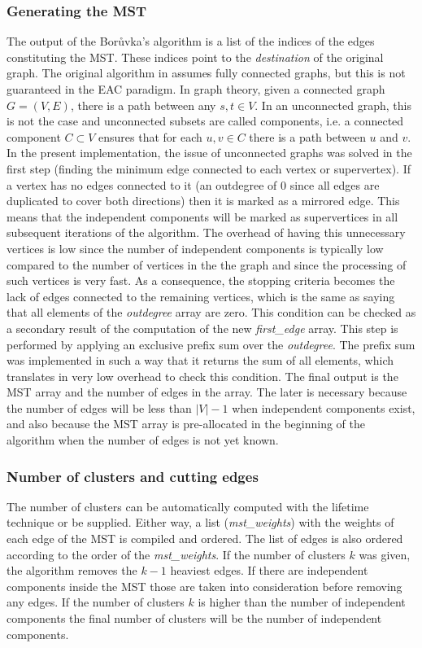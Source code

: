 \subsubsection{Generating the MST}
The output of the Borůvka's algorithm is a list of the indices of the edges constituting the MST. 
These indices point to the \emph{destination} of the original graph. 
The original algorithm in \cite{Sousa2015} assumes fully connected graphs, but this is not guaranteed in the EAC paradigm.
In graph theory, given a connected graph $G = (V,E)$, there is a path between any $s,t \in V$.
In an unconnected graph, this is not the case and unconnected subsets are called components, i.e. a connected component $C \subset V$ ensures that for each $u,v \in C$ there is a path between $u$ and $v$.
In the present implementation, the issue of unconnected graphs was solved in the first step (finding the minimum edge connected to each vertex or supervertex). 
If a vertex has no edges connected to it (an outdegree of 0 since all edges are duplicated to cover both directions) then it is marked as a mirrored edge. 
This means that the independent components will be marked as supervertices in all subsequent iterations of the algorithm. 
The overhead of having this unnecessary vertices is low since the number of independent components is typically low compared to the number of vertices in the the graph and since the processing of such vertices is very fast.
As a consequence, the stopping criteria becomes the lack of edges connected to the remaining vertices, which is the same as saying that all elements of the \emph{outdegree} array are zero. 
This condition can be checked as a secondary result of the computation of the new \emph{first\_edge} array. 
This step is performed by applying an exclusive prefix sum over the \emph{outdegree}. 
The prefix sum was implemented in such a way that it returns the sum of all elements, which translates in very low overhead to check this condition.
The final output is the MST array and the number of edges in the array. 
The later is necessary because the number of edges will be less than $|V|-1$ when independent components exist, and also because the MST array is pre-allocated in the beginning of the algorithm when the number of edges is not yet known.

\subsubsection{Number of clusters and cutting edges}
The number of clusters can be automatically computed with the lifetime technique or be supplied. 
Either way, a list (\emph{mst\_weights}) with the weights of each edge of the MST is compiled and ordered.
The list of edges is also ordered according to the order of the \emph{mst\_weights}. 
If the number of clusters $k$ was given, the algorithm removes the $k - 1$ heaviest edges. 
If there are independent components inside the MST those are taken into consideration before removing any edges.
If the number of clusters $k$ is higher than the number of independent components the final number of clusters will be the number of independent components.

